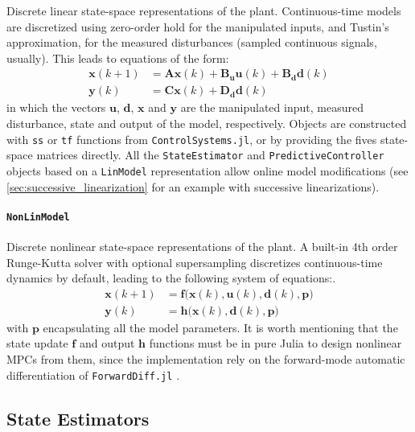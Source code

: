 Discrete linear state-space representations of the plant. Continuous-time models are discretized using zero-order hold for the manipulated inputs, and Tustin's approximation, for the measured disturbances (sampled continuous signals, usually). This leads to equations of the form:
\begin{subequations}
\begin{align}
    \mathbf{x}(k+1) &= \mathbf{A x}(k) + \mathbf{B_u u}(k) + \mathbf{B_d d}(k) \\
    \mathbf{y}(k)   &= \mathbf{C x}(k) + \mathbf{D_d d}(k)
\end{align}
\end{subequations}
in which the vectors $\mathbf{u}$, $\mathbf{d}$, $\mathbf{x}$ and $\mathbf{y}$ are the manipulated input, measured disturbance, state and output of the model, respectively. Objects are constructed with \texttt{ss} or \texttt{tf} functions from \texttt{ControlSystems.jl}, or by providing the fives state-space matrices directly. All the \texttt{StateEstimator} and \texttt{PredictiveController} objects based on a \texttt{LinModel} representation allow online model modifications (see \cref{sec:successive_linearization} for an example with successive linearizations).

\paragraph{\texttt{NonLinModel}}

Discrete nonlinear state-space representations of the plant. A built-in 4th order Runge-Kutta solver with optional supersampling discretizes continuous-time dynamics by default, leading to the following system of equations:. 
\begin{subequations}
\begin{align}
    \mathbf{x}(k+1) &= \mathbf{f}\big(\mathbf{x}(k), \mathbf{u}(k), \mathbf{d}(k), \mathbf{p} \big) \\
    \mathbf{y}(k)   &= \mathbf{h}\big( \mathbf{x}(k), \mathbf{d}(k), \mathbf{p} \big)
\end{align}
\end{subequations}
with $\mathbf{p}$ encapsulating all the model parameters. It is worth mentioning that the state update $\mathbf{f}$ and output $\mathbf{h}$ functions must be in pure Julia to design nonlinear MPCs from them, since the implementation rely on the forward-mode automatic differentiation of \texttt{ForwardDiff.jl} \citep{forwardDiff}.

\subsection{State Estimators}


